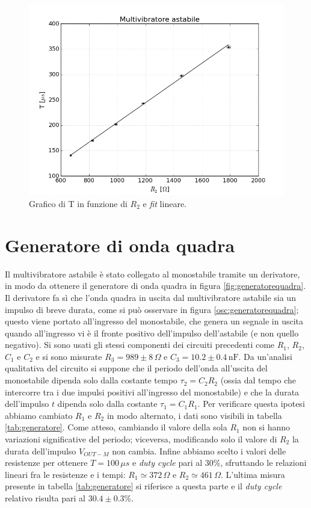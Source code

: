 \documentclass[10pt,a4paper]{article}
\begin{document}
\begin{figure}[!h]
  \centering
  \includegraphics[scale=0.7]{fitastabile.png}
\caption{Grafico di T in funzione di $R_2$ e \emph{fit} lineare.\label{fit:astabile}}
\end{figure}

\section{Generatore di onda quadra}
Il multivibratore astabile è stato collegato al monostabile tramite un derivatore, in modo da ottenere il generatore di onda quadra in figura \ref{fig:generatorequadra}. Il derivatore fa sì che l'onda quadra in uscita dal multivibratore astabile sia un impulso di breve durata, come si può osservare in figura \ref{osc:generatorequadra}; questo viene portato all'ingresso del monostabile, che genera un segnale in uscita quando all'ingresso vi è il fronte positivo dell'impulso dell'astabile (e non quello negativo). Si sono usati gli stessi componenti dei circuiti precedenti come $R_1$, $R_2$, $C_1$ e $C_2$ e si sono misurate $R_3=989\pm8\,\Omega$ e $C_3= 10.2\pm0.4 \,\text{nF}$. Da un'analisi qualitativa del circuito si suppone che il periodo dell'onda all'uscita del monostabile dipenda solo dalla costante tempo $\tau_2=C_2R_2$ (ossia dal tempo che intercorre tra i due impulsi positivi all'ingresso del monostabile) e che la durata dell'impulso $t$ dipenda solo dalla costante $\tau_1=C_1R_1$. Per verificare questa ipotesi abbiamo cambiato $R_1$ e $R_2$ in modo alternato, i dati sono visibili in tabella \ref{tab:generatore}. Come atteso, cambiando il valore della sola $R_1$ non si hanno variazioni significative del periodo; viceversa, modificando solo il valore di $R_2$ la durata dell'impulso $V_{OUT-M}$ non cambia.
Infine abbiamo scelto i valori delle resistenze per ottenere $T=100\,\mu s$ e \emph{duty cycle} pari al $30\%$, sfruttando le relazioni lineari fra le resistenze e i tempi: $R_1\simeq 372\,\Omega $ e $R_2 \simeq 461\,\Omega$. L'ultima misura presente in tabella \ref{tab:generatore} si riferisce a questa parte e il \emph{duty cycle} relativo risulta pari al $30.4\pm0.3\%$.
\end{document}
